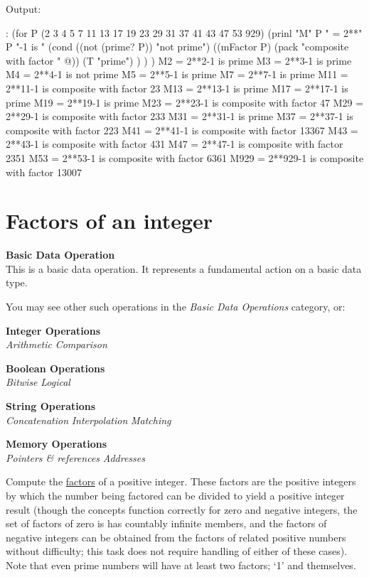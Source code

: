 \begin{wideverbatim}


Output:

: (for P (2 3 4 5 7 11 13 17 19 23 29 31 37 41 43 47 53 929)
   (prinl
      "M" P " = 2**" P "-1 is "
      (cond
         ((not (prime? P)) "not prime")
         ((mFactor P) (pack "composite with factor " @))
         (T "prime") ) ) )
M2 = 2**2-1 is prime
M3 = 2**3-1 is prime
M4 = 2**4-1 is not prime
M5 = 2**5-1 is prime
M7 = 2**7-1 is prime
M11 = 2**11-1 is composite with factor 23
M13 = 2**13-1 is prime
M17 = 2**17-1 is prime
M19 = 2**19-1 is prime
M23 = 2**23-1 is composite with factor 47
M29 = 2**29-1 is composite with factor 233
M31 = 2**31-1 is prime
M37 = 2**37-1 is composite with factor 223
M41 = 2**41-1 is composite with factor 13367
M43 = 2**43-1 is composite with factor 431
M47 = 2**47-1 is composite with factor 2351
M53 = 2**53-1 is composite with factor 6361
M929 = 2**929-1 is composite with factor 13007

\end{wideverbatim}

\pagebreak{}
\section*{Factors of an integer}

\textbf{Basic Data Operation}\\ This is a basic data operation. It
represents a fundamental action on a basic data type.

You may see other such operations in the \emph{Basic Data Operations}
category, or:

\textbf{Integer Operations} \\
\emph{Arithmetic} \textbar{} \emph{Comparison}

\textbf{Boolean Operations} \\ \emph{Bitwise} \textbar{}
\emph{Logical}

\textbf{String Operations} \\
\emph{Concatenation} \textbar{} \emph{Interpolation} \textbar{}
\emph{Matching}

\textbf{Memory Operations} \\
\emph{Pointers \& references} \textbar{} \emph{Addresses}

Compute the \href{http://en.wikipedia.org/wiki/Divisor}{factors} of a
positive integer. These factors are the positive integers by which the
number being factored can be divided to yield a positive integer result
(though the concepts function correctly for zero and negative integers,
the set of factors of zero is has countably infinite members, and the
factors of negative integers can be obtained from the factors of related
positive numbers without difficulty; this task does not require handling
of either of these cases). Note that even prime numbers will have at
least two factors; `1' and themselves.

